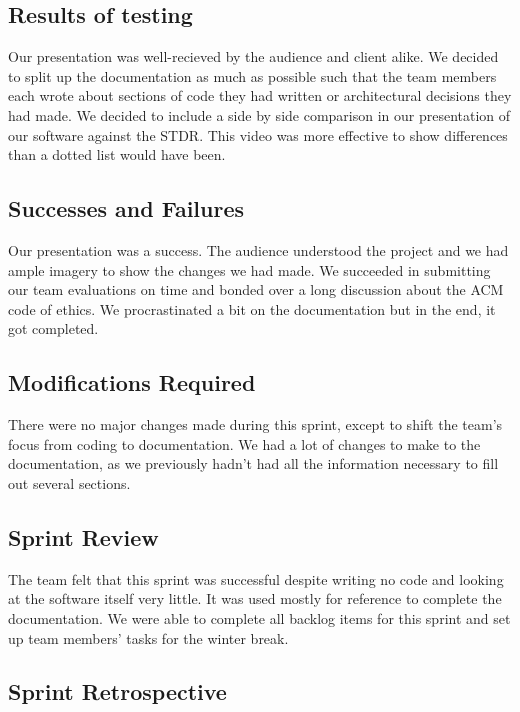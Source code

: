 \subsection{Results of testing}

Our presentation was well-recieved by the audience and client alike. We decided to split up the documentation as much as possible such that the team members each wrote about sections of code they had written or architectural decisions they had made. We decided to include a side by side comparison in our presentation of our software against the STDR. This video was more effective to show differences than a dotted list would have been.

\subsection{Successes and Failures}

Our presentation was a success. The audience understood the project and we had ample imagery to show the changes we had made. We succeeded in submitting our team evaluations on time and bonded over a long discussion about the ACM code of ethics. We procrastinated a bit on the documentation but in the end, it got completed. 

\subsection{Modifications Required}

There were no major changes made during this sprint, except to shift the team's focus from coding to documentation. We had a lot of changes to make to the documentation, as we previously hadn't had all the information necessary to fill out several sections.

\subsection{Sprint Review}

The team felt that this sprint was successful despite writing no code and looking at the software itself very little. It was used mostly for reference to complete the documentation. We were able to complete all backlog items for this sprint and set up team members' tasks for the winter break.

\subsection{Sprint Retrospective}

